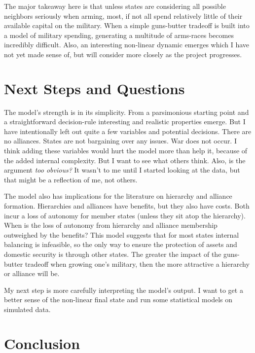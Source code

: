\documentclass[12pt]{article}
\begin{document}
The major takeaway here is that unless states are considering all possible neighbors seriously when arming, most, if not all spend relatively little of their available capital on the military. When a simple guns-butter tradeoff is built into a model of military spending, generating a multitude of arms-races becomes incredibly difficult. Also, an interesting non-linear dynamic emerges which I have not yet made sense of, but will consider more closely as the project progresses.

\section{Next Steps and Questions}\label{next steps}

The model's strength is in its simplicity. From a parsimonious starting point and a straightforward decision-rule interesting and realistic properties emerge. But I have intentionally left out quite a few variables and potential decisions. There are no alliances. States are not bargaining over any issues. War does not occur. I think adding these variables would hurt the model more than help it, because of the added internal complexity. But I want to see what others think. Also, is the argument \emph{too obvious?} It wasn't to me until I started looking at the data, but that might be a reflection of me, not others.

The model also has implications for the literature on hierarchy and alliance formation. Hierarchies and alliances have benefits, but they also have costs. Both incur a loss of autonomy for member states (unless they sit atop the hierarchy). When is the loss of autonomy from hierarchy and alliance membership outweighed by the benefits? This model suggests that for most states internal balancing is infeasible, so the only way to ensure the protection of assets and domestic security is through other states. The greater the impact of the guns-butter tradeoff when growing one's military, then the more attractive a hierarchy or alliance will be.

My next step is more carefully interpreting the model's output. I want to get a better sense of the non-linear final state and run some statistical models on simulated data. 

\section{Conclusion}
\end{document}
